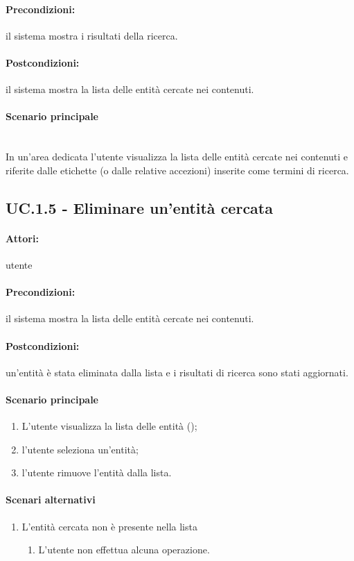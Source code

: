 \documentclass[10pt,a4paper,headinclude,footinclude,hidelinks]{scrreprt} %
\begin{document}
	\paragraph{Precondizioni:} il sistema mostra i risultati della ricerca.
	\paragraph{Postcondizioni:} il sistema mostra la lista delle entità cercate nei contenuti.
	\paragraph{Scenario principale} \hfill \\
	In un'area dedicata l'utente visualizza la lista delle entità cercate nei contenuti e riferite dalle etichette (o dalle relative accezioni) inserite come termini di ricerca.

	\subsection[UC.1.5]{UC.1.5 - Eliminare un'entità cercata}
	\label{sec:stage:ar:uc:1_5}
	\paragraph{Attori:} utente
	\paragraph{Precondizioni:} il sistema mostra la lista delle entità cercate nei contenuti.
	\paragraph{Postcondizioni:} un'entità è stata eliminata dalla lista e i risultati di ricerca sono stati aggiornati.
	\paragraph{Scenario principale}
	\begin{enumerate}
	\item L'utente visualizza la lista delle entità ();
	\item l'utente seleziona un'entità;
	\item l'utente rimuove l'entità dalla lista.
	\end{enumerate}
	\paragraph{Scenari alternativi}
	\begin{enumerate}
	\item L'entità cercata non è presente nella lista
		\begin{enumerate}
		\item L'utente non effettua alcuna operazione.
		\end{enumerate}
	\end{enumerate}
\end{document}
